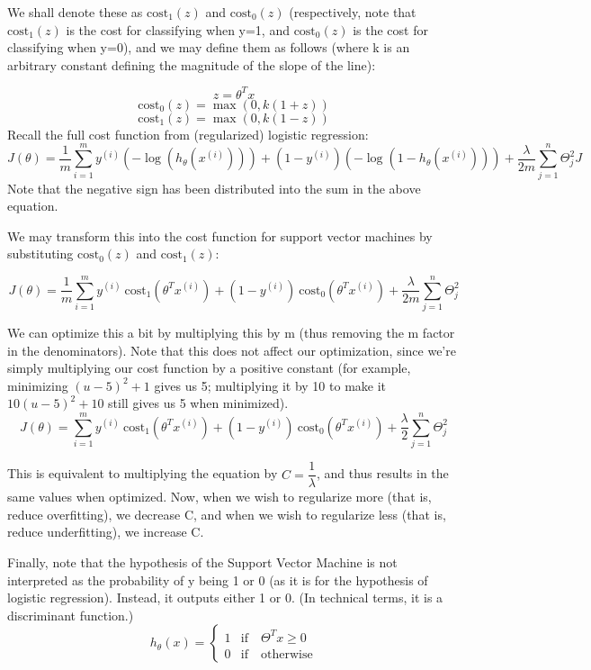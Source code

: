 We shall denote these as $\text{cost}_1(z)$ and $\text{cost}_0(z)$ (respectively, note that $\text{cost}_1(z)$ is the cost for classifying when y=1, and $\text{cost}_0(z)$ is the cost for classifying when y=0), and we may define them as follows (where k is an arbitrary constant defining the magnitude of the slope of the line):

$$z = \theta^Tx$$
$$\text{cost}_0(z) = \max(0, k(1+z))$$
$$\text{cost}_1(z) = \max(0, k(1-z))$$
Recall the full cost function from (regularized) logistic regression:
\begin{equation}
J(\theta) = \frac{1}{m} \sum_{i=1}^m y^{(i)}(-\log(h_\theta(x^{(i)}))) + (1 - y^{(i)})(-\log(1 - h_\theta(x^{(i)}))) + \dfrac{\lambda}{2m}\sum_{j=1}^n \Theta^2_jJ
\end{equation}
Note that the negative sign has been distributed into the sum in the above equation.

We may transform this into the cost function for support vector machines by substituting $\text{cost}_0(z)$ and $\text{cost}_1(z)$:

\begin{equation}
J(\theta) = \frac{1}{m} \sum_{i=1}^m y^{(i)} \ \text{cost}_1(\theta^Tx^{(i)}) + (1 - y^{(i)}) \ \text{cost}_0(\theta^Tx^{(i)}) + \dfrac{\lambda}{2m}\sum_{j=1}^n \Theta^2_j
\end{equation}

We can optimize this a bit by multiplying this by m (thus removing the m factor in the denominators). Note that this does not affect our optimization, since we're simply multiplying our cost function by a positive constant (for example, minimizing $(u-5)^2 + 1$ gives us 5; multiplying it by 10 to make it $10(u-5)^2 + 10$ still gives us 5 when minimized).
\begin{equation}
J(\theta) = \sum_{i=1}^m y^{(i)} \ \text{cost}_1(\theta^Tx^{(i)}) + (1 - y^{(i)}) \ \text{cost}_0(\theta^Tx^{(i)}) + \dfrac{\lambda}{2}\sum_{j=1}^n \Theta^2_j
\end{equation}

This is equivalent to multiplying the equation by $C = \dfrac{1}{\lambda}$, and thus results in the same values when optimized. Now, when we wish to regularize more (that is, reduce overfitting), we decrease C, and when we wish to regularize less (that is, reduce underfitting), we increase C.

Finally, note that the hypothesis of the Support Vector Machine is not interpreted as the probability of y being 1 or 0 (as it is for the hypothesis of logistic regression). Instead, it outputs either 1 or 0. (In technical terms, it is a discriminant function.)
\begin{equation}
h_\theta(x) = \begin{cases}1 & \text{if}\quad \Theta^Tx\ge0 \\0 &\text{if}\quad \text{otherwise}\end{cases}
\end{equation}

